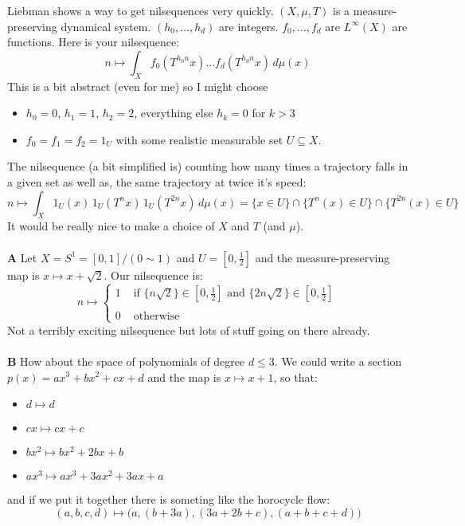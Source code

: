 \documentclass[12pt]{article}
\begin{document}
\newpage

\noindent Liebman shows a way to get nilsequences very quickly.  $(X, \mu, T)$ is a measure-preserving dynamical system. $(h_0, \dots, h_d)$ are integers.  $f_0, \dots, f_d$ are $L^\infty(X)$ are functions.  Here is your nilsequence:
$$ n \mapsto \int_X f_0( T^{h_0 n}x)\dots  f_d( T^{h_d n}x) \, d\mu(x) $$
This is a bit abstract (even for me) so I might choose
\begin{itemize}
\item $h_0 = 0$, $h_1 = 1$, $h_2 = 2$, everything else $h_k = 0$ for $k > 3$
\item $f_0 = f_1 = f_2 = 1_U$ with some realistic measurable set $U \subseteq X$.
\end{itemize}
The nilsequence (a bit simplified is) counting how many times a trajectory falls in a given set {\color{red!50!yellow!90!white}as well as}, the same trajectory at twice it's speed:
$$ n \mapsto \int_X 1_U( x) \, 1_U( T^n x) \, 1_U( T^{2n} x) \, d\mu(x)  =
 \Big\{ x \in U \Big\} \cap \Big\{ T^n(x)\in U\Big\} \cap \Big\{ T^{2n}(x) \in U \Big\} $$
It would be really nice to make a choice of $X$ and $T$ (and $\mu$). \\ \\
\textbf{A} Let $X = S^1 = [0,1]/(0\sim 1)$ and $U = [0, \frac{1}{2}]$ and the measure-preserving map is $x \mapsto x + \sqrt{2}$.  Our nilsequence is:
$$ n \mapsto \left\{ \begin{array}{cl} 
1  & \text{ if }  \{ n \sqrt{2} \} \in [0, \frac{1}{2}]  \text{ and }\{ 2n \sqrt{2} \} \in [0, \frac{1}{2}] \\ \\
0 & \text{ otherwise }\end{array} \right. $$
Not a terribly exciting nilsequence but lots of stuff going on there already. \\ \\
\textbf{B} How about the space of polynomials of degree $d \leq 3$.  We could write a section $p(x) = ax^3 + bx^2 + cx + d$ and the map is $x \mapsto x+1$, so that:
\begin{itemize}
\item $d \mapsto d$
\item $cx \mapsto cx + c$
\item $bx^2 \mapsto bx^2 + 2bx + b$
\item $ax^3 \mapsto ax^3 + 3ax^2 + 3a x + a$
\end{itemize}
and if we put it together there is someting like the horocycle flow:
$$ (a,b,c,d) \mapsto \big( a, (b + 3a), (3a+2b+c),(a+b+c+d) \big) $$
\end{document}
